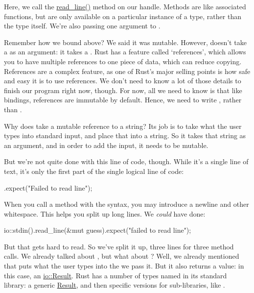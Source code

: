 Here, we call the \href{https://doc.rust-lang.org/std/io/struct.Stdin.html\#method.read\_line}{read\_line()} method on our handle.
Methods are like associated functions, but are only available on a particular instance of a type, rather than the type itself. 
We’re also passing one argument to .

\blank

Remember how we bound  above? We said it was mutable. However,  doesn’t take a  as 
an argument: it takes a . Rust has a feature called ‘references’, which allows you to have multiple references 
to one piece of data, which can reduce copying. References are a complex feature, as one of Rust’s major selling points is how 
safe and easy it is to use references. We don’t need to know a lot of those details to finish our program right now, though. 
For now, all we need to know is that like  bindings, references are immutable by default. Hence, we need to write 
, rather than .

\blank

Why does  take a mutable reference to a string? Its job is to take what the user types into standard input, 
and place that into a string. So it takes that string as an argument, and in order to add the input, it needs to be mutable.

\blank

But we’re not quite done with this line of code, though. While it’s a single line of text, it’s only the first part of the 
single logical line of code:

\begin{rustc}
        .expect("Failed to read line");
\end{rustc}

When you call a method with the  syntax, you may introduce a newline and other whitespace. This helps you 
split up long lines. We \emph{could} have done:

\begin{rustc}
    io::stdin().read_line(&mut guess).expect("failed to read line");
\end{rustc}

But that gets hard to read. So we’ve split it up, three lines for three method calls. We already talked about ,
but what about ? Well, we already mentioned that  puts what the user types into the 
 we pass it. But it also returns a value: in this case, an 
\href{https://doc.rust-lang.org/std/io/type.Result.html}{io::Result}. Rust has a number of types named  in its 
standard library: a generic \href{https://doc.rust-lang.org/std/result/enum.Result.html}{Result}, and then specific versions 
for sub-libraries, like .

